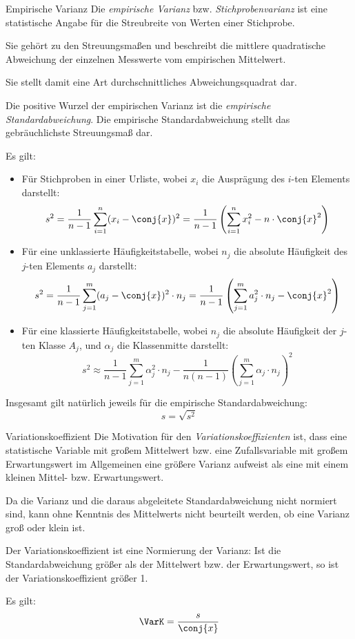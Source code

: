 \begin{defi}{Empirische Varianz}
    Die \emph{empirische Varianz} bzw. \emph{Stichprobenvarianz}  ist eine statistische Angabe für die Streubreite von Werten einer Stichprobe.

    Sie gehört zu den Streuungsmaßen und beschreibt die mittlere quadratische Abweichung der einzelnen Messwerte vom empirischen Mittelwert.

    Sie stellt damit eine Art durchschnittliches Abweichungsquadrat dar.

    Die positive Wurzel der empirischen Varianz ist die \emph{empirische Standardabweichung}.
    Die empirische Standardabweichung stellt das gebräuchlichste Streuungsmaß dar.

    Es gilt:
    \begin{itemize}
        \item Für Stichproben in einer Urliste, wobei $x_i$ die Ausprägung des $i$-ten Elements darstellt:
              \[
                  s^2 = \frac{1}{n-1} \sum_{i=1}^{n} (x_i - \conj{x})^2 = \frac{1}{n-1} \left( \sum_{i=1}^{n} x_i^2 - n\cdot \conj{x}^2 \right)
              \]
        \item Für eine unklassierte Häufigkeitstabelle, wobei $n_j$ die absolute Häufigkeit des $j$-ten Elements $a_j$ darstellt:
              \[
                  s^2 = \frac{1}{n-1} \sum_{j=1}^{m} (a_j - \conj{x})^2 \cdot n_j = \frac{1}{n-1} \left( \sum_{j=1}^{m} a_j^2 \cdot n_j - \conj{x}^2 \right)
              \]
        \item Für eine klassierte Häufigkeitstabelle, wobei $n_j$ die absolute Häufigkeit der $j$-ten Klasse $A_j$, und $\alpha_j$ die Klassenmitte darstellt:
              \[
                  s^2 \approx \frac{1}{n-1} \sum_{j=1}^{m} \alpha_j^2 \cdot n_j - \frac{1}{n(n-1)} \left( \sum_{j=1}^{m} \alpha_j \cdot n_j \right)^2
              \]
    \end{itemize}

    Insgesamt gilt natürlich jeweils für die empirische Standardabweichung:
    \[
        s = \sqrt{s^2}
    \]
\end{defi}

\begin{bonus}{Variationskoeffizient}
    Die Motivation für den \emph{Variationskoeffizienten} ist, dass eine statistische Variable mit großem Mittelwert bzw. eine Zufallsvariable mit großem Erwartungswert im Allgemeinen eine größere Varianz aufweist als eine mit einem kleinen Mittel- bzw. Erwartungswert.

    Da die Varianz und die daraus abgeleitete Standardabweichung nicht normiert sind, kann ohne Kenntnis des Mittelwerts nicht beurteilt werden, ob eine Varianz groß oder klein ist.

    Der Variationskoeffizient ist eine Normierung der Varianz: Ist die Standardabweichung größer als der Mittelwert bzw. der Erwartungswert, so ist der Variationskoeffizient größer 1.

    Es gilt:
    \[
        \VarK = \frac{s}{\conj{x}}
    \]
\end{bonus}

